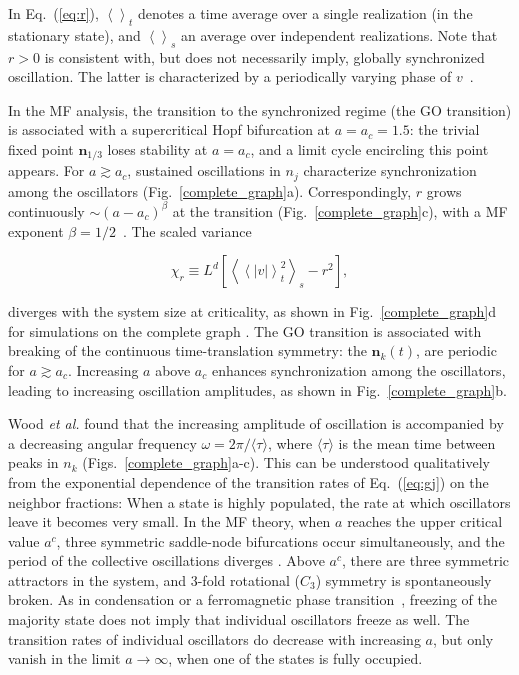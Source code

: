 \noindent In Eq.~(\ref{eq:r}),  $\left< \right>_t$ denotes a time average over a single realization (in the stationary state), and
$\left< \right>_s$ an average over independent realizations. Note that $r > 0$ is consistent with, but does not necessarily imply,
globally synchronized oscillation. The latter is characterized by a periodically varying phase of
$v$~\cite{Kuramoto92a,Ohta08,ShinomotoKuramoto86,Rozenblit11}.

In the MF analysis, the transition to the synchronized regime (the GO transition) is associated with a supercritical Hopf bifurcation
at $a=a_c=1.5$: the trivial fixed point $\textbf{n}_{1/3}$ loses stability at $a=a_c$, and a limit cycle encircling this point appears.
For $a \gtrsim a_c$, sustained oscillations in $n_j$ characterize synchronization among the oscillators (Fig.~\ref{complete_graph}a).
Correspondingly, $r$ grows continuously $\sim (a-a_c)^\beta$ at the transition (Fig.~\ref{complete_graph}c), with a MF exponent $\beta
= 1/2$~\cite{Wood06a}. The scaled variance

\begin{equation}
    \chi_r \equiv L^d \left[ \left< \left< |v| \right>^2_t \right>_s - r^2 \right],
    \label{eq:chir}
\end{equation}

\noindent diverges with the system size at criticality, as shown in Fig.~\ref{complete_graph}d for simulations on the complete graph
\cite{assis2011infinite}. The GO transition is associated with breaking of the continuous time-translation symmetry: the
$\textbf{n}_k(t)$, are periodic for $a\gtrsim a_c$.  Increasing $a$ above $a_c$ enhances synchronization among the oscillators, leading
to increasing oscillation amplitudes, as shown in Fig.~\ref{complete_graph}b.

Wood \textit{et al.} found that the increasing amplitude of oscillation is accompanied by a decreasing angular frequency $\omega =
2\pi/\langle \tau \rangle$, where $\langle \tau \rangle$ is the mean time between peaks in $n_k$ (Figs.~\ref{complete_graph}a-c). This
can be understood qualitatively from the exponential dependence of the transition rates of Eq.~(\ref{eq:gj}) on the neighbor fractions:
When a state is highly populated, the rate at which oscillators leave it becomes very small.  In the MF theory, when $a$ reaches the
upper critical value $a^c$, three symmetric saddle-node bifurcations occur simultaneously, and the period of the collective
oscillations diverges \cite{assis2011infinite}. Above $a^c$, there are three symmetric attractors in the system, and 3-fold rotational
($C_3$) symmetry is spontaneously broken.  As in condensation or a ferromagnetic phase transition~\cite{Huang}, freezing of the
majority state does not imply that individual oscillators freeze as well.  The transition rates of individual oscillators do decrease
with increasing $a$, but only vanish in the limit $a\to\infty$, when one of the states is fully occupied.

